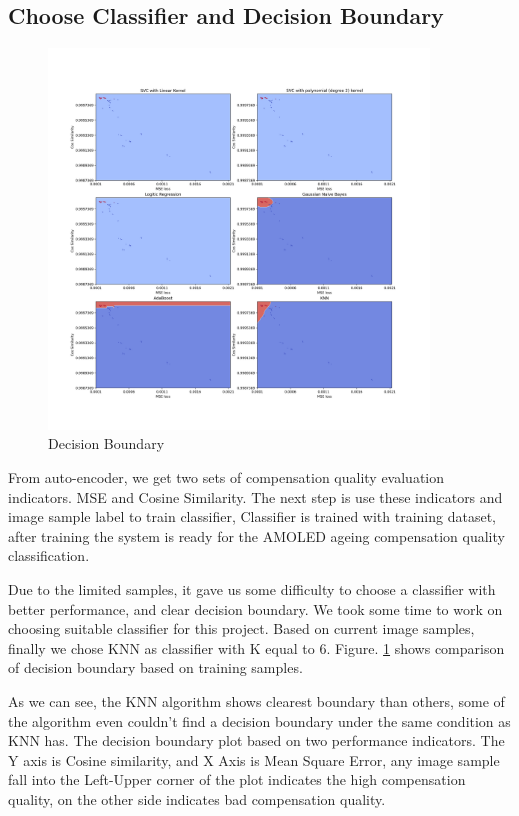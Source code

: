 \documentclass[runningheads]{llncs}
\begin{document}
\subsection{Choose Classifier and Decision Boundary}

\begin{figure}[H]
    \centering
    \includegraphics[width=0.9\textwidth]{decision-boundary.png}
    \caption{Decision Boundary}
    \label{decisionBound}
\end{figure}

From auto-encoder, we get two sets of compensation quality evaluation indicators. MSE and Cosine Similarity. The next step is use these indicators and image sample label to train classifier, Classifier is trained with training dataset, after training the system is ready for the AMOLED ageing compensation quality classification.

Due to the limited samples, it gave us some difficulty to choose a classifier with better performance, and clear decision boundary. We took some time to work on choosing suitable classifier for this project. Based on current image samples, finally we chose KNN as classifier with K equal to 6. Figure. \ref{decisionBound} shows comparison of decision boundary based on training samples.

As we can see, the KNN algorithm shows clearest boundary than others, some of the algorithm even couldn't find a decision boundary under the same condition as KNN has. The decision boundary plot based on two performance indicators. The Y axis is Cosine similarity, and X Axis is Mean Square Error, any image sample fall into the Left-Upper corner of the plot indicates the high compensation quality, on the other side indicates bad compensation quality.
\end{document}
